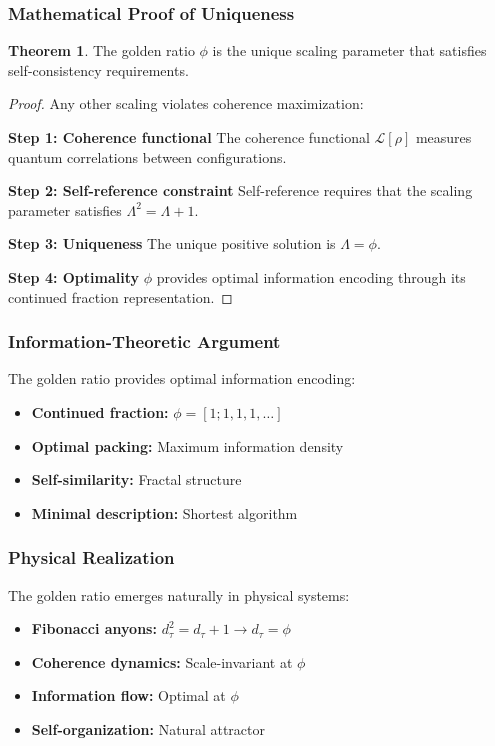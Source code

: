 \documentclass[11pt]{article}
\theoremstyle{definition}
\newtheorem{theorem}{Theorem}[section]
\newcommand{\goldenratio}{\phi}
\newcommand{\density}{\rho}
\newcommand{\fibonacci}{\tau}
\begin{document}
\subsubsection{Mathematical Proof of Uniqueness}

\begin{theorem}
The golden ratio $\goldenratio$ is the unique scaling parameter that satisfies self-consistency requirements.
\end{theorem}

\begin{proof}
Any other scaling violates coherence maximization:

\textbf{Step 1: Coherence functional}
The coherence functional $\mathcal{L}[\density]$ measures quantum correlations between configurations.

\textbf{Step 2: Self-reference constraint}
Self-reference requires that the scaling parameter satisfies $\Lambda^2 = \Lambda + 1$.

\textbf{Step 3: Uniqueness}
The unique positive solution is $\Lambda = \goldenratio$.

\textbf{Step 4: Optimality}
$\goldenratio$ provides optimal information encoding through its continued fraction representation.
\end{proof}

\subsubsection{Information-Theoretic Argument}

The golden ratio provides optimal information encoding:

\begin{itemize}
\item \textbf{Continued fraction:} $\goldenratio = [1; 1, 1, 1, \ldots]$
\item \textbf{Optimal packing:} Maximum information density
\item \textbf{Self-similarity:} Fractal structure
\item \textbf{Minimal description:} Shortest algorithm
\end{itemize}

\subsubsection{Physical Realization}

The golden ratio emerges naturally in physical systems:

\begin{itemize}
\item \textbf{Fibonacci anyons:} $d_\fibonacci^2 = d_\fibonacci + 1 \to d_\fibonacci = \goldenratio$
\item \textbf{Coherence dynamics:} Scale-invariant at $\goldenratio$
\item \textbf{Information flow:} Optimal at $\goldenratio$
\item \textbf{Self-organization:} Natural attractor
\end{itemize}
\end{document}
